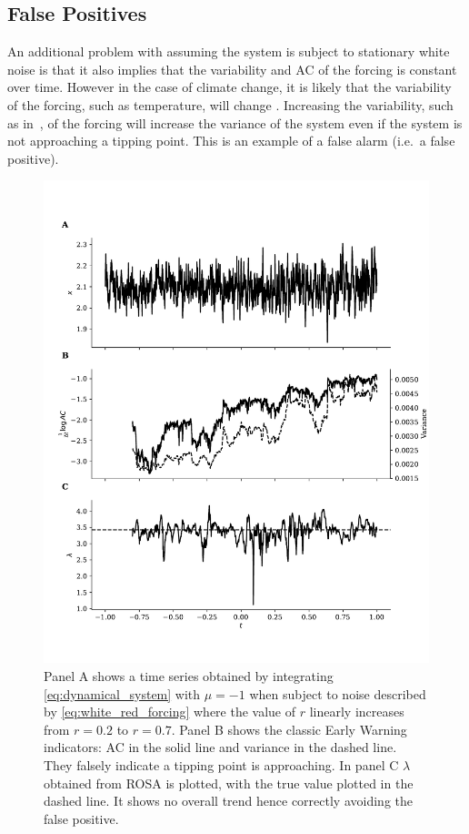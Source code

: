\subsection{False Positives}
An additional problem with assuming the system is subject to stationary white noise is that it also implies that the
variability and AC of the forcing is constant over time. 
However in the case of 
climate change, it is likely that the variability of the forcing,
such as temperature, will change \parencite{Huntingford2013}. 
Increasing the variability, such as in~\cite{Boers2021a}, of the forcing will increase the variance of the system even
if the system is not approaching a tipping point. This is an example of a false
alarm (i.e.\ a false positive). 

\begin{figure}
\includegraphics[width=\textwidth,keepaspectratio]{figure2}
\caption[Early Warning Signal False Positive]{Panel A shows a time series obtained by integrating  \cref{eq:dynamical_system} with $\mu = -1$ when subject to
  noise described by \cref{eq:white_red_forcing} where the
  value of $r$ linearly increases from $r=0.2$ to $r=0.7$. Panel B 
  shows the classic Early Warning indicators: AC in the solid
  line and variance in the dashed line. They falsely indicate a
  tipping point is approaching. In panel C $\lambda$ obtained
  from ROSA is plotted, with the true value plotted in the dashed line. It shows
  no overall trend hence correctly avoiding the false positive.}\label{fig:changing_forcing}
\end{figure}


